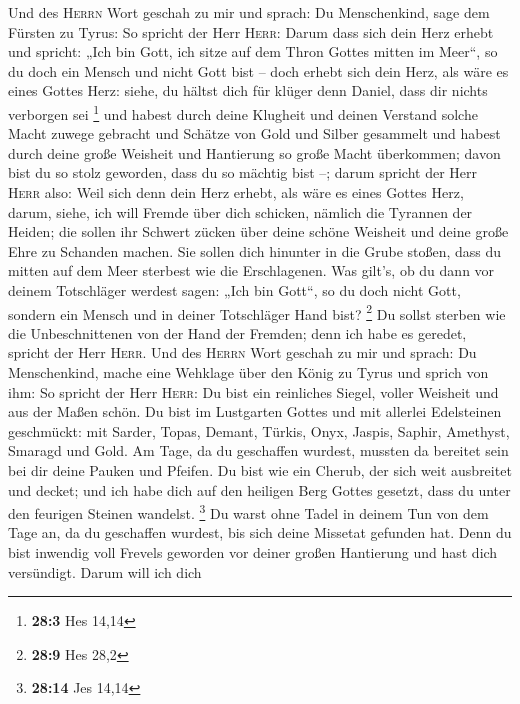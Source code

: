  Und des \textsc{Herrn} Wort geschah zu mir und sprach:
 Du Menschenkind, sage dem Fürsten zu Tyrus: So spricht
der Herr \textsc{Herr}: Darum dass sich dein Herz erhebt und spricht:
„Ich bin Gott, ich sitze auf dem Thron Gottes mitten im Meer``, so du
doch ein Mensch und nicht Gott bist -- doch erhebt sich dein Herz, als
wäre es eines Gottes Herz:  siehe, du hältst dich für
klüger denn Daniel, dass dir nichts verborgen sei \footnote{\textbf{28:3}
  Hes 14,14}  und habest durch deine Klugheit und deinen
Verstand solche Macht zuwege gebracht und Schätze von Gold und Silber
gesammelt  und habest durch deine große Weisheit und
Hantierung so große Macht überkommen; davon bist du so stolz geworden,
dass du so mächtig bist --;  darum spricht der Herr
\textsc{Herr} also: Weil sich denn dein Herz erhebt, als wäre es eines
Gottes Herz,  darum, siehe, ich will Fremde über dich
schicken, nämlich die Tyrannen der Heiden; die sollen ihr Schwert zücken
über deine schöne Weisheit und deine große Ehre zu Schanden machen.
 Sie sollen dich hinunter in die Grube stoßen, dass du
mitten auf dem Meer sterbest wie die Erschlagenen.  Was
gilt's, ob du dann vor deinem Totschläger werdest sagen: „Ich bin
Gott``, so du doch nicht Gott, sondern ein Mensch und in deiner
Totschläger Hand bist? \footnote{\textbf{28:9} Hes 28,2} 
Du sollst sterben wie die Unbeschnittenen von der Hand der Fremden; denn
ich habe es geredet, spricht der Herr \textsc{Herr}.  Und
des \textsc{Herrn} Wort geschah zu mir und sprach:  Du
Menschenkind, mache eine Wehklage über den König zu Tyrus und sprich von
ihm: So spricht der Herr \textsc{Herr}: Du bist ein reinliches Siegel,
voller Weisheit und aus der Maßen schön.  Du bist im
Lustgarten Gottes und mit allerlei Edelsteinen geschmückt: mit Sarder,
Topas, Demant, Türkis, Onyx, Jaspis, Saphir, Amethyst, Smaragd und Gold.
Am Tage, da du geschaffen wurdest, mussten da bereitet sein bei dir
deine Pauken und Pfeifen.  Du bist wie ein Cherub, der
sich weit ausbreitet und decket; und ich habe dich auf den heiligen Berg
Gottes gesetzt, dass du unter den feurigen Steinen wandelst. \footnote{\textbf{28:14}
  Jes 14,14}  Du warst ohne Tadel in deinem Tun von dem
Tage an, da du geschaffen wurdest, bis sich deine Missetat gefunden hat.
 Denn du bist inwendig voll Frevels geworden vor deiner
großen Hantierung und hast dich versündigt. Darum will ich dich
